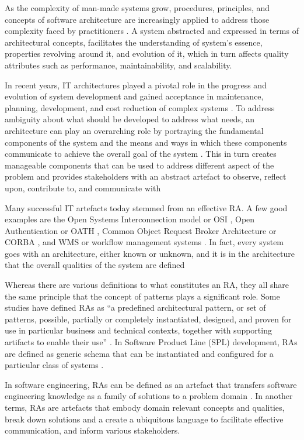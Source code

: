 \documentclass[review]{elsarticle}
\begin{document}
As the complexity of man-made systems grow, procedures, principles, and concepts of software architecture are increasingly applied to address those complexity faced by practitioners \cite{AtaeiACIS}. A system abstracted and expressed in terms of architectural concepts, facilitates the understanding of system’s essence, properties revolving around it, and evolution of it, which in turn affects quality attributes such as performance, maintainability, and scalability. 


In recent years, IT architectures played a pivotal role in the progress and evolution of system development and gained acceptance in maintenance, planning, development, and cost reduction of complex systems \cite{martinez2015solid}. To address ambiguity about what should be developed to address what needs, an architecture can play an overarching role by portraying the fundamental components of the system and the means and ways in which these components communicate to achieve the overall goal of the system \cite{Sievi-Korte}. This in turn creates manageable components that can be used to address different aspect of the problem and provides stakeholders with an abstract artefact to observe, reflect upon, contribute to, and communicate with \cite{kohler2019towards}

Many successful IT artefacts today stemmed from an effective RA. A few good examples are the Open Systems Interconnection model or OSI \cite{zimmermann1980osi}, Open Authentication or OATH \cite{OATH}, Common Object Request Broker Architecture or CORBA \cite{pope1998corba}, and WMS or workflow management systems \cite{greefhorst1999een}. In fact, every system goes with an architecture, either known or unknown, and it is in the architecture that the overall qualities of the system are defined

Whereas there are various definitions to what constitutes an RA, they all share the same principle that the concept of patterns plays a significant role. Some studies have defined RAs as “a predefined architectural pattern, or set of patterns, possible, partially or completely instantiated, designed, and proven for use in particular business and technical contexts, together with supporting artifacts to enable their use” \cite{Cloutier}. In Software Product Line (SPL) development, RAs are defined as generic schema that can be instantiated and configured for a particular class of systems \cite{Derras}.

In software engineering, RAs can be defined as an artefact that transfers software engineering knowledge as a family of solutions to a problem domain \cite{Klein}. In another terms, RAs are artefacts that embody domain relevant concepts and qualities, break down solutions and a create a ubiquitous language to facilitate effective communication, and inform various stakeholders. 
\end{document}
